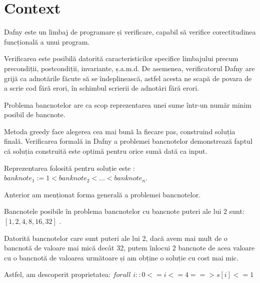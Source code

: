 
\chapter{Context} 

 
Dafny este un limbaj de programare și verificare, capabil să verifice corectitudinea
funcțională a unui program.\par
Verificarea este posibilă datorită caracteristicilor specifice limbajului precum precondiții, postcondiții, 
invariante, ș.a.m.d. De asemenea, verificatorul Dafny are grijă ca adnotările făcute să se îndeplinească,
astfel acesta ne scapă de povara de a scrie cod fără erori, în schimbul scrierii de adnotări fără erori.
 
Problema bancnotelor are ca scop reprezentarea unei sume într-un număr minim posibil de bancnote.\par
Metoda greedy face alegerea cea mai bună la fiecare pas, construind soluția finală.
Verificarea formală in Dafny a problemei bancnotelor demonstrează faptul că soluția construită este optimă
pentru orice sumă dată ca input. \par
Reprezentarea folosită pentru soluție este :
$ banknote_{1}:= 1 < banknote_{2} < ... < banknote_{n} $. 

Anterior am menționat forma generală a problemei bancnotelor.\par
Bancnotele posibile în problema bancnotelor cu bancnote puteri ale lui 2 sunt: 
$[1, 2, 4, 8, 16, 32]$ . 

Datorită bancnotelor care sunt puteri ale lui 2, dacă avem mai mult de o bancnotă de valoare mai mică decât 32,
putem înlocui 2 bancnote de acea valoare cu o bancnotă de valoarea următoare și am obține o soluție cu cost mai mic.\par
Astfel, am descoperit proprietatea: 
$  forall$ $i :: 0 <= i <= 4 ==> s[i] <= 1 $

